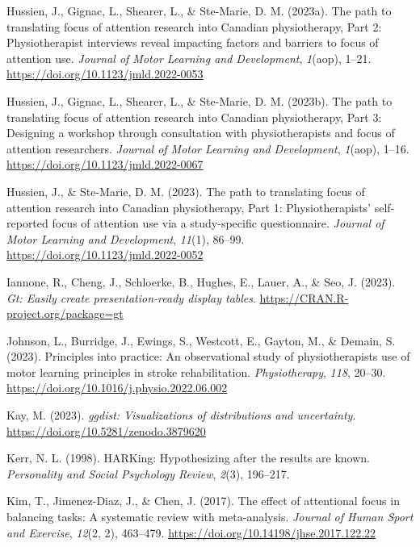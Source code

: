 \documentclass[
  11pt,
  doc, donotrepeattitle,floatsintext]{apa7}
\newlength{\cslhangindent}
\newlength{\cslentryspacingunit} %
\newenvironment{CSLReferences}[2] %
 {%
  \setlength{\parindent}{0pt}
  \ifodd #1
  \let\oldpar\par
  \def\par{\hangindent=\cslhangindent\oldpar}
  \fi
  \setlength{\parskip}{#2\cslentryspacingunit}
 }%
 {}
\begin{document}
\begin{CSLReferences}{1}{0}
\leavevmode{}%
Hussien, J., Gignac, L., Shearer, L., \& Ste-Marie, D. M. (2023a). The path to translating focus of attention research into {Canadian} physiotherapy, {Part} 2: {Physiotherapist} interviews reveal impacting factors and barriers to focus of attention use. \emph{Journal of Motor Learning and Development}, \emph{1}(aop), 1--21. \url{https://doi.org/10.1123/jmld.2022-0053}

\leavevmode{}%
Hussien, J., Gignac, L., Shearer, L., \& Ste-Marie, D. M. (2023b). The path to translating focus of attention research into {Canadian} physiotherapy, {Part} 3: {Designing} a workshop through consultation with physiotherapists and focus of attention researchers. \emph{Journal of Motor Learning and Development}, \emph{1}(aop), 1--16. \url{https://doi.org/10.1123/jmld.2022-0067}

\leavevmode{}%
Hussien, J., \& Ste-Marie, D. M. (2023). The path to translating focus of attention research into {Canadian} physiotherapy, {Part} 1: {Physiotherapists}' self-reported focus of attention use via a study-specific questionnaire. \emph{Journal of Motor Learning and Development}, \emph{11}(1), 86--99. \url{https://doi.org/10.1123/jmld.2022-0052}

\leavevmode{}%
Iannone, R., Cheng, J., Schloerke, B., Hughes, E., Lauer, A., \& Seo, J. (2023). \emph{Gt: Easily create presentation-ready display tables}. \url{https://CRAN.R-project.org/package=gt}

\leavevmode{}%
Johnson, L., Burridge, J., Ewings, S., Westcott, E., Gayton, M., \& Demain, S. (2023). Principles into practice: {An} observational study of physiotherapists use of motor learning principles in stroke rehabilitation. \emph{Physiotherapy}, \emph{118}, 20--30. \url{https://doi.org/10.1016/j.physio.2022.06.002}

\leavevmode{}%
Kay, M. (2023). \emph{{ggdist}: Visualizations of distributions and uncertainty}. \url{https://doi.org/10.5281/zenodo.3879620}

\leavevmode{}%
Kerr, N. L. (1998). HARKing: Hypothesizing after the results are known. \emph{Personality and Social Psychology Review}, \emph{2}(3), 196--217.

\leavevmode{}%
Kim, T., Jimenez-Diaz, J., \& Chen, J. (2017). The effect of attentional focus in balancing tasks: {A} systematic review with meta-analysis. \emph{Journal of Human Sport and Exercise}, \emph{12}(2, 2), 463--479. \url{https://doi.org/10.14198/jhse.2017.122.22}


\end{CSLReferences}
\end{document}
